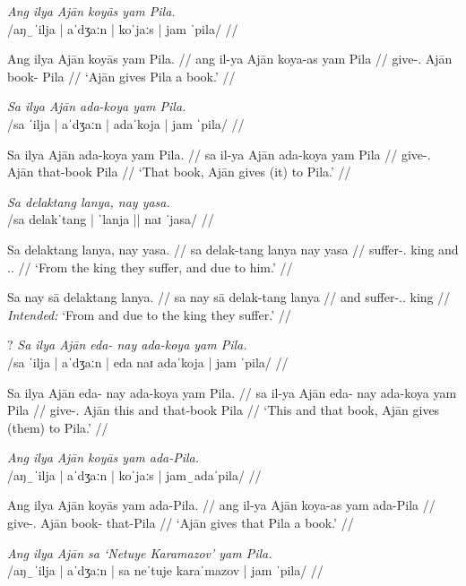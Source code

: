 \documentclass[12pt,a4paper]{scrartcl}
\newcommand{\TsgM}{{\Tsg}.{\M}}
\newcommand{\TplM}{{\Tpl}.{\M}}
\begin{document}
\ex\begingl
\glpreamble \textit{Ang ilya Ajān koyās yam Pila.}\\
	/aŋ‿ˈilja | aˈdʒaːn | koˈjaːs | jam ˈpila/ //

\gla Ang ilya Ajān koyās yam Pila. //
\glb ang il-ya Ajān koya-as yam Pila //
\glc \AgtT{} give-\TsgM{} Ajān book-\Parg{} \Dat{} Pila //
\glft `Ajān gives Pila a book.' //
\endgl\xe

\ex\begingl
\glpreamble \textit{Sa ilya Ajān ada-koya yam Pila.}\\
	/sa ˈilja | aˈdʒaːn | adaˈkoja | jam ˈpila/ //

\gla Sa ilya Ajān ada-koya yam Pila. //
\glb sa il-ya Ajān ada-koya yam Pila //
\glc \PatT{} give-\TsgM{} Ajān that-book \Dat{} Pila //
\glft `That book, Ajān gives (it) to Pila.' //
\endgl\xe

\pex
\a\begingl
\glpreamble \textit{Sa delaktang lanya, nay yasa.} \\
	/sa delakˈtang | ˈlanja || naɪ ˈjasa/ //

\gla Sa delaktang lanya, nay yasa. //
\glb sa delak-tang lanya nay yasa //
\glc \PatT{} suffer-\TplM{} king and \TsgM{}.\Caus{} //
\glft `From the king they suffer, and due to him.' //
\endgl

\a\ljudge*\begingl
\gla Sa nay sā delaktang lanya. //
\glb sa nay sā delak-tang lanya //
\glc \PatT{} and \CauT{} suffer-\TplM{}.\Aarg{} king //
\glft \textit{Intended:} `From and due to the king they suffer.' //
\endgl

\xe

\ex\ljudge?\begingl
\glpreamble \textit{Sa ilya Ajān eda- nay ada-koya yam Pila.}\\
	/sa ˈilja | aˈdʒaːn | eda naɪ adaˈkoja | jam ˈpila/ //

\gla Sa ilya Ajān eda- nay ada-koya yam Pila. //
\glb sa il-ya Ajān eda- nay ada-koya yam Pila //
\glc \PatT{} give-\TsgM{} Ajān this and that-book \Dat{} Pila //
\glft `This and that book, Ajān gives (them) to Pila.' //
\endgl\xe

\ex\begingl
\glpreamble \textit{Ang ilya Ajān koyās yam ada-Pila.}\\
	/aŋ‿ˈilja | aˈdʒaːn | koˈjaːs | jam‿adaˈpila/ //

\gla Ang ilya Ajān koyās yam ada-Pila. //
\glb ang il-ya Ajān koya-as yam ada-Pila //
\glc \AgtT{} give-\TsgM{} Ajān book-\Parg{} \Dat{} that-Pila //
\glft `Ajān gives that Pila a book.' //
\endgl\xe

\ex\begingl
\glpreamble \textit{Ang ilya Ajān sa `Netuye Karamazov' yam Pila.}\\
	/aŋ‿ˈilja | aˈdʒaːn | sa neˈtuje karaˈmazov | jam ˈpila/ //
\end{document}
